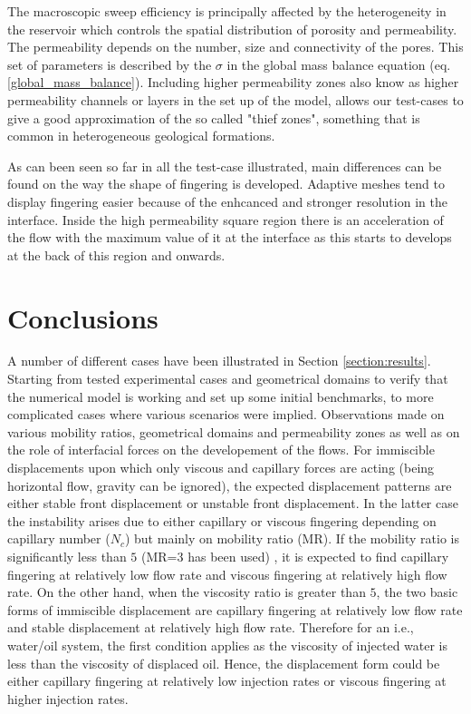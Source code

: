 \documentclass[preprint,authoryear,12pt]{elsarticle}
\begin{document}
\medskip
The macroscopic sweep efficiency is principally affected by the heterogeneity in the reservoir which controls the spatial distribution of porosity and permeability. The permeability depends on the number, size and connectivity of the pores. This set of parameters is described by the $\sigma$ in the global mass balance equation (eq.\ref{global_mass_balance}). Including higher permeability zones also know as higher permeability channels or layers in the set up of the model, allows our test-cases to give a good approximation of the so called "thief zones", something that is common in heterogeneous geological formations.

\medskip 
As can been seen so far in all the test-case illustrated, main differences can be found on the way the shape of fingering is developed. Adaptive meshes tend to display fingering easier because of the enhcanced and stronger resolution in the interface. Inside the high permeability square region there is an acceleration of the flow with the maximum value of it at the interface as this starts to develops at the back of this region and onwards. %

\section{Conclusions}

\medskip
A number of different cases have been illustrated in Section \ref{section:results}. Starting from tested experimental cases and geometrical domains to verify that the numerical model is working and set up some initial benchmarks, to more complicated cases where various scenarios were implied. Observations made on various mobility ratios, geometrical domains and permeability zones as well as on the role of interfacial forces on the developement of the flows. For immiscible displacements upon which only viscous and capillary forces are acting (being horizontal flow, gravity can be ignored), the expected displacement patterns are either stable front displacement or unstable front displacement. In the latter case the instability arises due to either capillary or viscous fingering depending on capillary number ($N_{c}$) but mainly on mobility ratio (MR). If the mobility ratio is significantly less than $5$ (MR=$3$ has been used) , it is expected to find capillary fingering at relatively low flow rate and viscous fingering at relatively high flow rate. On the other hand, when the viscosity ratio is greater than $5$, the two basic forms of immiscible displacement are capillary fingering at relatively low flow rate and stable displacement at relatively high flow rate. Therefore for an i.e., water/oil system, the first condition applies as the viscosity of injected water is less than the viscosity of displaced oil. Hence, the displacement form could be either capillary fingering at relatively low injection rates or viscous fingering at higher injection rates. 
\end{document}
